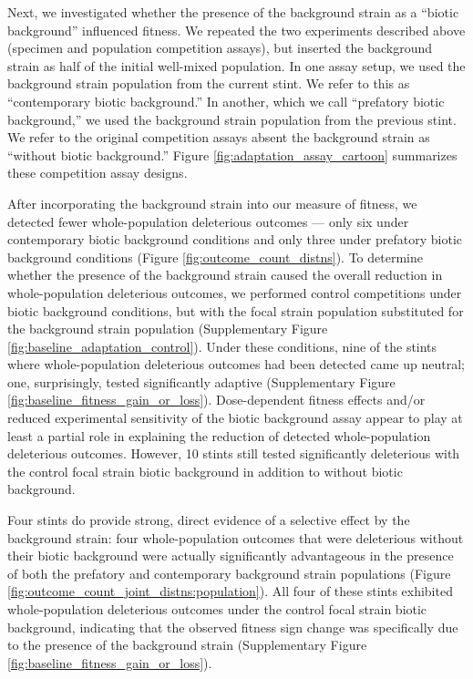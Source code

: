 Next, we investigated whether the presence of the background strain as a ``biotic background'' influenced fitness.
We repeated the two experiments described above (specimen and population competition assays), but inserted the background strain as half of the initial well-mixed population.
In one assay setup, we used the background strain population from the current stint.
We refer to this as ``contemporary biotic background.''
In another, which we call ``prefatory biotic background,'' we used the background strain population from the previous stint.
We refer to the original competition assays absent the background strain as ``without biotic background.''
Figure \ref{fig:adaptation_assay_cartoon} summarizes these competition assay designs.



After incorporating the background strain into our measure of fitness, we detected fewer whole-population deleterious outcomes --- only six under contemporary biotic background conditions and only three under prefatory biotic background conditions (Figure \ref{fig:outcome_count_distns}).
To determine whether the presence of the background strain caused the overall reduction in whole-population deleterious outcomes, we performed control competitions under biotic background conditions, but with the focal strain population substituted for the background strain population (Supplementary Figure \ref{fig:baseline_adaptation_control}).
Under these conditions, nine of the stints where whole-population deleterious outcomes had been detected came up neutral;
one, surprisingly, tested significantly adaptive (Supplementary Figure \ref{fig:baseline_fitness_gain_or_loss}).
Dose-dependent fitness effects and/or reduced experimental sensitivity of the biotic background assay appear to play at least a partial role in explaining the reduction of detected whole-population deleterious outcomes.
However, 10 stints still tested significantly deleterious with the control focal strain biotic background in addition to without biotic background.

Four stints do provide strong, direct evidence of a selective effect by the background strain: four whole-population outcomes that were deleterious without their biotic background were actually significantly advantageous in the presence of both the prefatory and contemporary background strain populations (Figure \ref{fig:outcome_count_joint_distns:population}).
All four of these stints exhibited whole-population deleterious outcomes under the control focal strain biotic background, indicating that the observed fitness sign change was specifically due to the presence of the background strain (Supplementary Figure \ref{fig:baseline_fitness_gain_or_loss}).

